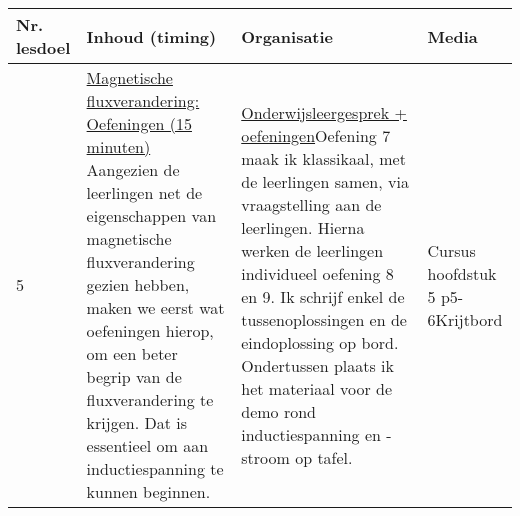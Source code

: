 \begin{landscape}
\begin{tabularx}{1.56\textwidth}{|p{1.5cm}|p{8cm}|X|p{3cm}|}
	\hline
	\textbf{Nr. lesdoel } & \textbf{Inhoud (timing)}  & \textbf{Organisatie } & \textbf{Media } \\ \hline
	5\newline\newline 6& \underline{Magnetische fluxverandering:} \underline{Oefeningen (15 minuten)}\newline
	Aangezien de leerlingen net de eigenschappen van magnetische fluxverandering gezien hebben, maken we eerst wat oefeningen hierop, om een beter begrip van de fluxverandering te krijgen. Dat is essentieel om aan inductiespanning te kunnen beginnen.
	&  \underline{Onderwijsleergesprek + oefeningen}\newline  Oefening 7 maak ik klassikaal, met de leerlingen samen, via vraagstelling aan de leerlingen. Hierna werken de leerlingen individueel oefening 8 en 9. Ik schrijf enkel de tussenoplossingen en de eindoplossing op bord. Ondertussen plaats ik het materiaal voor de demo rond inductiespanning en -stroom op tafel.
	&  Cursus hoofdstuk 5 p5-6\newline\newline Krijtbord
	\\ \hline
\end{tabularx}\vspace{5mm}




\end{landscape}
